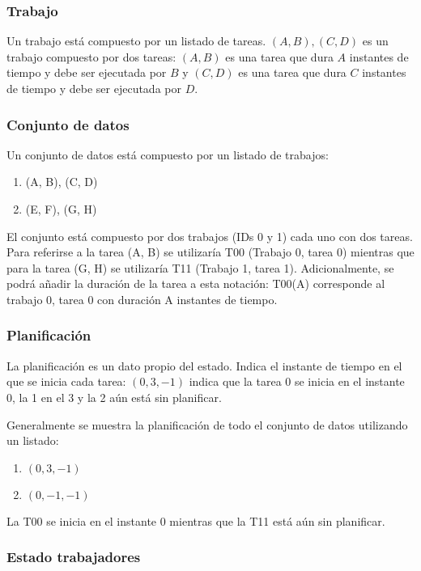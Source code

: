 \subsubsection{Trabajo}

Un trabajo está compuesto por un listado de tareas.
$(A, B), (C, D)$ es un trabajo compuesto por dos tareas:
$(A, B)$ es una tarea que dura $A$ instantes de tiempo y debe ser ejecutada por $B$ y
$(C, D)$ es una tarea que dura $C$ instantes de tiempo y debe ser ejecutada por $D$.

\subsubsection{Conjunto de datos}

Un conjunto de datos está compuesto por un listado de trabajos:
\begin{enumerate}[start=0, itemsep=0.25px]
    \item (A, B), (C, D)
    \item (E, F), (G, H)
\end{enumerate}
El conjunto está compuesto por dos trabajos (IDs 0 y 1) cada uno con dos tareas.
Para referirse a la tarea (A, B) se utilizaría T00 (Trabajo 0, tarea 0)
mientras que para la tarea (G, H) se utilizaría T11 (Trabajo 1, tarea 1).
Adicionalmente, se podrá añadir la duración de la tarea a esta notación:
T00(A) corresponde al trabajo 0, tarea 0 con duración A instantes de tiempo.

\subsubsection{Planificación}

La planificación es un dato propio del estado.
Indica el instante de tiempo en el que se inicia cada tarea:
$(0, 3, -1)$ indica que la tarea 0 se inicia en el instante 0,
la 1 en el 3 y la 2 aún está sin planificar.

Generalmente se muestra la planificación de todo el conjunto de datos
utilizando un listado:
\begin{enumerate}[start=0, itemsep=0.25px]
    \item $(0, 3, -1)$
    \item $(0, -1, -1)$
\end{enumerate}
La T00 se inicia en el instante 0 mientras que la T11 está aún sin planificar.

\subsubsection{Estado trabajadores}

